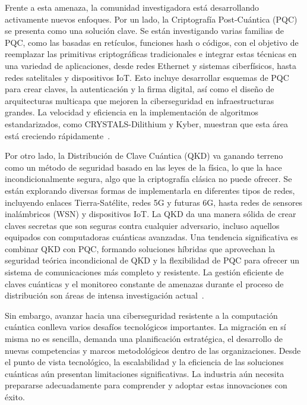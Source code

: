 Frente a esta amenaza, la comunidad investigadora está desarrollando activamente nuevos enfoques. Por un lado, la Criptografía Post-Cuántica (PQC) se presenta como una solución clave. Se están investigando varias familias de PQC, como las basadas en retículos, funciones hash o códigos, con el objetivo de reemplazar las primitivas criptográficas tradicionales e integrar estas técnicas en una variedad de aplicaciones, desde redes Ethernet y sistemas ciberfísicos, hasta redes satelitales y dispositivos IoT. Esto incluye desarrollar esquemas de PQC para crear claves, la autenticación y la firma digital, así como el diseño de arquitecturas multicapa que mejoren la ciberseguridad en infraestructuras grandes. La velocidad y eficiencia en la implementación de algoritmos estandarizados, como CRYSTALS-Dilithium y Kyber, muestran que esta área está creciendo rápidamente~\cite{NIST2021Ready}. 

Por otro lado, la Distribución de Clave Cuántica (QKD) va ganando terreno como un método de seguridad basado en las leyes de la física, lo que la hace incondicionalmente segura, algo que la criptografía clásica no puede ofrecer. Se están explorando diversas formas de implementarla en diferentes tipos de redes, incluyendo enlaces Tierra-Satélite, redes 5G y futuras 6G, hasta redes de sensores inalámbricos (WSN) y dispositivos IoT. La QKD da una manera sólida de crear claves secretas que son seguras contra cualquier adversario, incluso aquellos equipados con computadoras cuánticas avanzadas. Una tendencia significativa es combinar QKD con PQC, formando soluciones híbridas que aprovechan la seguridad teórica incondicional de QKD y la flexibilidad de PQC para ofrecer un sistema de comunicaciones más completo y resistente. La gestión eficiente de claves cuánticas y el monitoreo constante de amenazas durante el proceso de distribución son áreas de intensa investigación actual~\cite{Hansora2025}. 

Sin embargo, avanzar hacia una ciberseguridad resistente a la computación cuántica conlleva varios desafíos tecnológicos importantes. La migración en sí misma no es sencilla, demanda una planificación estratégica, el desarrollo de nuevas competencias y marcos metodológicos dentro de las organizaciones. Desde el punto de vista tecnológico, la escalabilidad y la eficiencia de las soluciones cuánticas aún presentan limitaciones significativas.  La industria aún necesita prepararse adecuadamente para comprender y adoptar estas innovaciones con éxito.
